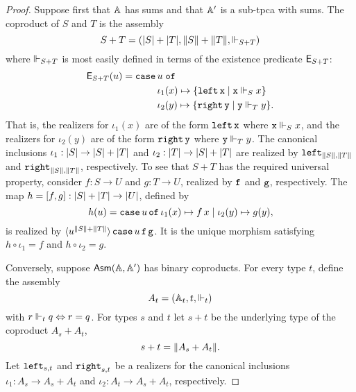 \begin{proof}
  Suppose first that $\AA$ has sums and that $\subAA$ is a sub-tpca
  with sums. The coproduct of $S$ and $T$ is the assembly
  \begin{equation*}
    S + T = (\S{S} + \S{T}, \T{S} + \T{T}, \rz[S + T])
  \end{equation*}
  where $\rz[S+T]$ is most easily defined in terms of the existence
  predicate $\Ex_{S+T}$:
  \begin{equation*}
    \Ex_{S+T}(u) =
    \xcase{u}
    {\iota_1(x)}{\set{\combLeft\,\R{x} \such \R{x} \rz[S] x}}
    {\iota_2(y)}{\set{\combRight\,\R{y} \such \R{y} \rz[T] y}.}
  \end{equation*}
  That is, the realizers for $\iota_1(x)$ are of the form
  $\combLeft\,\R{x}$ where $\R{x} \rz[S] x$, and the realizers for
  $\iota_2(y)$ are of the form $\combRight\,\R{y}$ where $\R{y} \rz[T]
  y$. The canonical inclusions $\iota_1 : \S{S} \to \S{S} + \S{T}$ and $\iota_2 :
  \S{T} \to \S{S} + \S{T}$ are realized by $\combLeft_{\T{S},\T{T}}$ and
  $\combRight_{\T{S},\T{T}}$, respectively.
  To see that $S + T$ has the required universal property,
  consider $f : S \to U$ and $g : T \to U$,
  realized by $\R{f}$ and $\R{g}$, respectively. The map $h = [f,g] :
  \S{S} + \S{T} \to \S{U}$, defined by
  \begin{equation*}
    h(u) = \case{u}{\iota_1(x)}{f\,x}{\iota_2(y)}{g(y)},
  \end{equation*}
  is realized by
  $\tpcalam{u}{\T{S}+\T{T}}{\combCase\,u\,\R{f}\,\R{g}}$. It is the
  unique morphism satisfying $h \circ \iota_1 = f$ and $h \circ
  \iota_2 = g$.

  Conversely, suppose $\AsmA$ has binary coproducts. For every type
  $t$, define the assembly
  \begin{equation*}
    A_t = (\Atyp{t}, t, {\rz[t]})
  \end{equation*}
  with $r \rz[t] q \liff r = q$. For types $s$ and $t$ let $s+t$ be the
  underlying type of the coproduct $A_s + A_t$,
  \begin{equation*}
    s + t = \T{A_s + A_t}.
  \end{equation*}
  Let $\combLeft_{s,t}$ and $\combRight_{s,t}$ be a realizers for the
  canonical inclusions $\iota_1 : A_s \to A_s + A_t$
  and $\iota_2 : A_t \to A_s + A_t$, respectively.


\end{proof}
